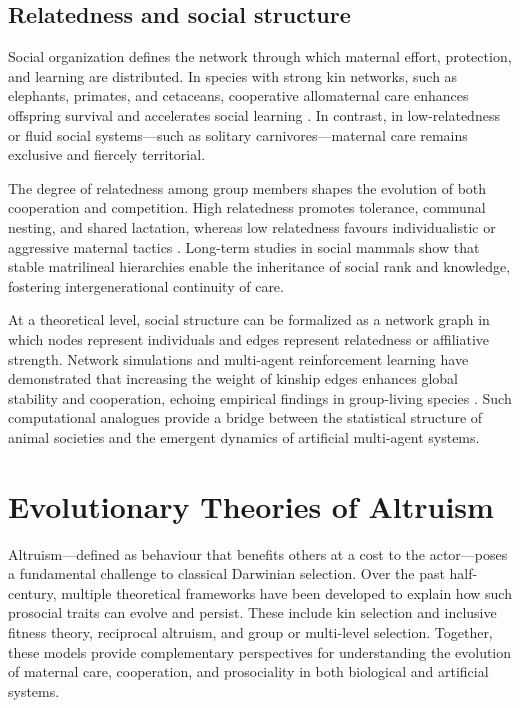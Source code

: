     \subsection{Relatedness and social structure}

        Social organization defines the network through which maternal effort, protection, and learning are distributed.  In species with strong kin networks, such as elephants, primates, and cetaceans, cooperative allomaternal care enhances offspring survival and accelerates social learning \cite{mcnamara2008, hamilton1964a}.  In contrast, in low-relatedness or fluid social systems—such as solitary carnivores—maternal care remains exclusive and fiercely territorial.
        
        The degree of relatedness among group members shapes the evolution of both cooperation and competition.  High relatedness promotes tolerance, communal nesting, and shared lactation, whereas low relatedness favours individualistic or aggressive maternal tactics \cite{lukas2018}.  Long-term studies in social mammals show that stable matrilineal hierarchies enable the inheritance of social rank and knowledge, fostering intergenerational continuity of care.
        
        At a theoretical level, social structure can be formalized as a network graph in which nodes represent individuals and edges represent relatedness or affiliative strength.  Network simulations and multi-agent reinforcement learning have demonstrated that increasing the weight of kinship edges enhances global stability and cooperation, echoing empirical findings in group-living species \cite{wang2018}.  Such computational analogues provide a bridge between the statistical structure of animal societies and the emergent dynamics of artificial multi-agent systems.


\section{Evolutionary Theories of Altruism}
Altruism—defined as behaviour that benefits others at a cost to the actor—poses a fundamental challenge to classical Darwinian selection.  Over the past half-century, multiple theoretical frameworks have been developed to explain how such prosocial traits can evolve and persist.  These include kin selection and inclusive fitness theory, reciprocal altruism, and group or multi-level selection.  Together, these models provide complementary perspectives for understanding the evolution of maternal care, cooperation, and prosociality in both biological and artificial systems.

